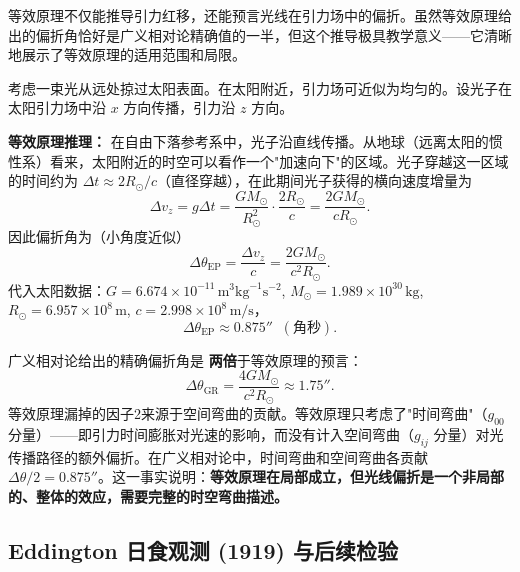 等效原理不仅能推导引力红移，还能预言光线在引力场中的偏折。虽然等效原理给出的偏折角恰好是广义相对论精确值的一半，但这个推导极具教学意义——它清晰地展示了等效原理的适用范围和局限。

\begin{example}[用等效原理推导光线偏折——因子2错误]
考虑一束光从远处掠过太阳表面。在太阳附近，引力场可近似为均匀的。设光子在太阳引力场中沿 $x$ 方向传播，引力沿 $z$ 方向。

\textbf{等效原理推理：} 在自由下落参考系中，光子沿直线传播。从地球（远离太阳的惯性系）看来，太阳附近的时空可以看作一个"加速向下"的区域。光子穿越这一区域的时间约为 $\Delta t \approx 2R_\odot / c$（直径穿越），在此期间光子获得的横向速度增量为
\begin{equation}
    \Delta v_z = g \Delta t = \frac{GM_\odot}{R_\odot^2} \cdot \frac{2R_\odot}{c} = \frac{2GM_\odot}{c R_\odot}.
\end{equation}
因此偏折角为（小角度近似）
\begin{equation}
    \boxed{\Delta\theta_{\text{EP}} = \frac{\Delta v_z}{c} = \frac{2GM_\odot}{c^2 R_\odot}}.
\end{equation}
代入太阳数据：$G = 6.674 \times 10^{-11}\,\text{m}^3\text{kg}^{-1}\text{s}^{-2}$, $M_\odot = 1.989 \times 10^{30}\,\text{kg}$, $R_\odot = 6.957 \times 10^8\,\text{m}$, $c = 2.998 \times 10^8\,\text{m/s}$，
\begin{equation}
    \Delta\theta_{\text{EP}} \approx 0.875'' \;\;(\text{角秒}).
\end{equation}
\end{example}

\begin{note}[因子2的缺失]
广义相对论给出的精确偏折角是 \textbf{两倍}于等效原理的预言：
\begin{equation}
    \boxed{\Delta\theta_{\text{GR}} = \frac{4GM_\odot}{c^2 R_\odot} \approx 1.75''}.
\end{equation}
等效原理漏掉的因子2来源于空间弯曲的贡献。等效原理只考虑了"时间弯曲"（$g_{00}$ 分量）——即引力时间膨胀对光速的影响，而没有计入空间弯曲（$g_{ij}$ 分量）对光传播路径的额外偏折。在广义相对论中，时间弯曲和空间弯曲各贡献 $\Delta\theta/2 = 0.875''$。这一事实说明：\textbf{等效原理在局部成立，但光线偏折是一个非局部的、整体的效应，需要完整的时空弯曲描述。}
\end{note}

\subsection{Eddington 日食观测 (1919) 与后续检验}

